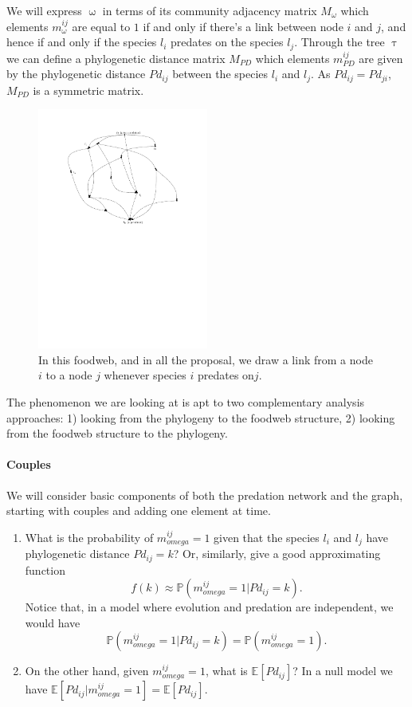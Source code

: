 \documentclass[12pt,a4paper]{report}
\begin{document}
We will express $\upomega$ in terms of its community adjacency matrix $M_{\omega}$ which elements $m_{\omega}^{ij}$ are equal to $1$ if and only if there's a link between node $i$ and $j$, and hence if and only if the species $l_i$ predates on the species $l_j$. Through the tree $\uptau$ we can define a phylogenetic distance matrix $M_{PD}$ which elements $m_{PD}^{ij}$ are given by the phylogenetic distance $Pd_{ij}$ between the species $l_i$ and $l_j$. As $Pd_{ij} = Pd_{ji}$, $M_{PD}$ is a symmetric matrix.
\begin{figure}[ht]
	\centering
		\includegraphics[width=0.5\textwidth]{images/foodweb}
		\caption{In this foodweb, and in all the proposal, we draw a link from a node $i$ to a node $j$ whenever species $i$ predates on$j$.}
		\label{fig:foodweb}
\end{figure}

The phenomenon we are looking at is apt to two complementary analysis approaches: 1) looking from the phylogeny to the foodweb structure, 2) looking from the foodweb structure to the phylogeny.

\paragraph{Couples}

We will consider basic components of both the predation network and the graph, starting with couples and adding one element at time.

\begin{enumerate}
\item What is the probability of $m_{omega}^{ij} = 1$ given that the species $l_i$ and $l_j$ have phylogenetic distance $Pd_{ij}=k$? Or, similarly, give a good approximating function \[f(k) \approx \mathbb{P}(m_{omega}^{ij} = 1 | Pd_{ij}=k ).\]
Notice that, in a model where evolution and predation are independent, we would have \[\mathbb{P}(m_{omega}^{ij} = 1 | Pd_{ij}=k ) = \mathbb{P}(m_{omega}^{ij} = 1) .\]

\item On the other hand, given $m_{omega}^{ij} = 1$, what is $\mathbb{E}\left[Pd_{ij}\right]$?
In a null model we have $\mathbb{E}\left[Pd_{ij} | m_{omega}^{ij} = 1 \right] = \mathbb{E}\left[Pd_{ij}\right]$.
\end{enumerate}
\end{document}
